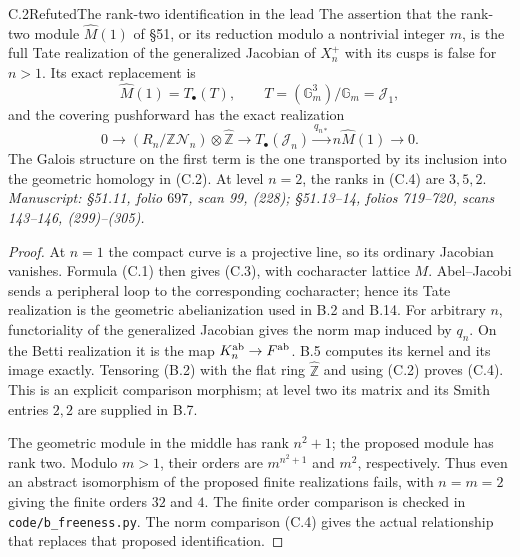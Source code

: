 \begin{statement}{C.2}{Refuted}{The rank-two identification in the lead}
The assertion that the rank-two module \(\widehat M(1)\) of \S51,
or its reduction modulo a nontrivial integer \(m\), is the full
Tate realization of the generalized Jacobian of \(X_n^+\) with its
cusps is false for \(n>1\).
Its exact replacement is
\[
 \widehat M(1)=T_\bullet(T),\qquad
 T=(\mathbb G_m^3)/\mathbb G_m=\mathcal J_1,
                                                               \tag{C.3}
\]
and the covering pushforward has the exact realization
\[
 0\longrightarrow
 (R_n/\mathbb Z\mathcal N_n)\otimes\widehat{\mathbb Z}
 \longrightarrow T_\bullet(\mathcal J_n)
 \xrightarrow{q_{n*}}n\widehat M(1)\longrightarrow0.             \tag{C.4}
\]
The Galois structure on the first term is the one transported by its
inclusion into the geometric homology in (C.2).
At level \(n=2\), the ranks in (C.4) are \(3,5,2\).
\emph{Manuscript: \S51.11, folio \(697\), scan 99, (228);
\S51.13--14, folios 719--720, scans 143--146, (299)--(305).}
\end{statement}
\begin{proof}
At \(n=1\) the compact curve is a projective line, so its ordinary
Jacobian vanishes. Formula (C.1) then gives (C.3), with cocharacter
lattice \(M\). Abel--Jacobi sends a peripheral loop to the corresponding
cocharacter; hence its Tate realization is the geometric abelianization
used in B.2 and B.14.
For arbitrary \(n\), functoriality of the generalized Jacobian gives
the norm map induced by \(q_n\). On the Betti realization it is
the map \(K_n^{\rm ab}\to F^{\rm ab}\). B.5 computes its kernel
and its image exactly. Tensoring (B.2) with the flat ring
\(\widehat{\mathbb Z}\) and using (C.2) proves (C.4).
This is an explicit comparison morphism; at level two its matrix
and its Smith entries \(2,2\) are supplied in B.7.

The geometric module in the middle has rank \(n^2+1\); the proposed
module has rank two. Modulo \(m>1\), their orders are
\(m^{n^2+1}\) and \(m^2\), respectively. Thus even an abstract
isomorphism of the proposed finite realizations fails, with
\(n=m=2\) giving the finite orders \(32\) and \(4\).
The finite order comparison is checked in
\texttt{code/b\_freeness.py}. The norm comparison (C.4) gives the actual relationship that
replaces that proposed identification.
\end{proof}

